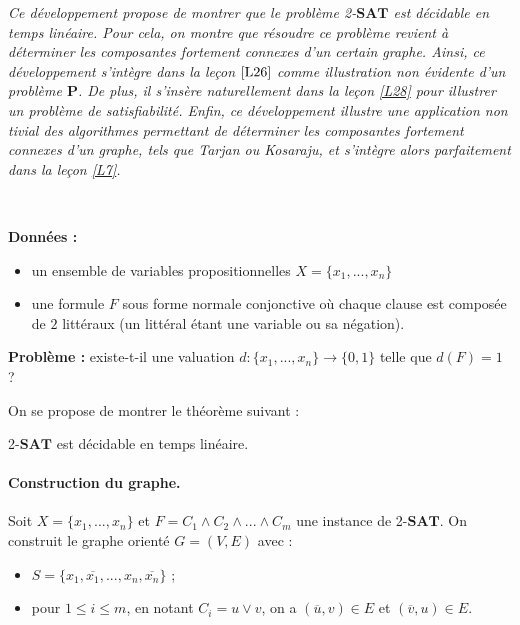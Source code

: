 
\textit{Ce développement propose de montrer que le problème 2-$\mathbf{SAT}$ est décidable en temps linéaire. Pour cela, on montre que résoudre ce problème revient à déterminer les composantes fortement connexes d'un certain graphe. 
Ainsi, ce développement s'intègre dans la leçon $\ref{L26}$ comme illustration non évidente d'un problème $\mathbf{P}$. De plus, il s'insère naturellement dans la leçon \ref{L28} pour illustrer un problème de satisfiabilité. Enfin, ce développement illustre une application non tivial des algorithmes permettant de déterminer les composantes fortement connexes d'un graphe, tels que Tarjan ou Kosaraju, et s'intègre alors parfaitement dans la leçon \ref{L7}.}

\begin{definition}~

\noindent \textbf{Données :} 
\begin{itemize}
\item un ensemble de variables propositionnelles $X = \{x_1,...,x_n\}$
\item une formule $F$ sous forme normale conjonctive où chaque clause est composée de $2$ littéraux (un littéral étant une variable ou sa négation).
\end{itemize}
\noindent\textbf{Problème :} existe-t-il une valuation $ d : \{x_1,...,x_n\} \rightarrow \{0,1\}$ telle que $d(F)=1$ ?
\end{definition}

On se propose de montrer le théorème suivant :

\begin{theorem}\label{2SAT1}
2-$\mathbf{SAT}$ est décidable en temps linéaire.
\end{theorem}

\paragraph{Construction du graphe.} Soit $X= \{x_1,...,x_n\}$ et $F=C_1 \wedge C_2 \wedge ... \wedge C_m$ une instance de 2-$\mathbf{SAT}$. On construit le graphe orienté $G=(V,E)$ avec :
\begin{itemize}
\item $S = \{x_1,\overline{x_1},...,x_n,\overline{x_n} \}$ ;
\item pour $1\leq i \leq m$, en notant $C_i = u \vee v$, on a $(\overline{u},v) \in E$ et $(\overline{v},u) \in E$.
\end{itemize}

